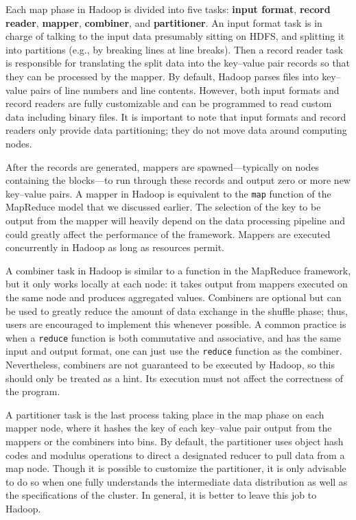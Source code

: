 \documentclass[]{krantz}
\begin{document}
Each map phase in Hadoop is divided into five tasks: \textbf{input
format}, \textbf{record reader}, \textbf{mapper}, \textbf{combiner}, and
\textbf{partitioner}. An {input format} task is in charge of talking to
the input data presumably sitting on HDFS, and splitting it into
partitions (e.g., by breaking lines at line breaks). Then a {record
reader} task is responsible for translating the split data into the
key--value pair records so that they can be processed by the mapper. By
default, Hadoop parses files into key--value pairs of line numbers and
line contents. However, both input formats and record readers are fully
customizable and can be programmed to read custom data including binary
files. It is important to note that input formats and record readers
only provide data partitioning; they do not move data around computing
nodes.

After the records are generated, mappers are spawned---typically on
nodes containing the blocks---to run through these records and output
zero or more new key--value pairs. A mapper in Hadoop is equivalent to
the \texttt{map} function of the MapReduce model that we discussed
earlier. The selection of the key to be output from the mapper will
heavily depend on the data processing pipeline and could greatly affect
the performance of the framework. Mappers are executed concurrently in
Hadoop as long as resources permit.

A combiner task in Hadoop is similar to a function in the MapReduce
framework, but it only works locally at each node: it takes output from
mappers executed on the same node and produces aggregated values.
Combiners are optional but can be used to greatly reduce the amount of
data exchange in the shuffle phase; thus, users are encouraged to
implement this whenever possible. A common practice is when a
\texttt{reduce} function is both commutative and associative, and has
the same input and output format, one can just use the \texttt{reduce}
function as the combiner. Nevertheless, combiners are not guaranteed to
be executed by Hadoop, so this should only be treated as a hint. Its
execution must not affect the correctness of the program.

A partitioner task is the last process taking place in the map phase on
each mapper node, where it hashes the key of each key--value pair output
from the mappers or the combiners into bins. By default, the partitioner
uses object hash codes and modulus operations to direct a designated
reducer to pull data from a map node. Though it is possible to customize
the partitioner, it is only advisable to do so when one fully
understands the intermediate data distribution as well as the
specifications of the cluster. In general, it is better to leave this
job to Hadoop.
\end{document}
